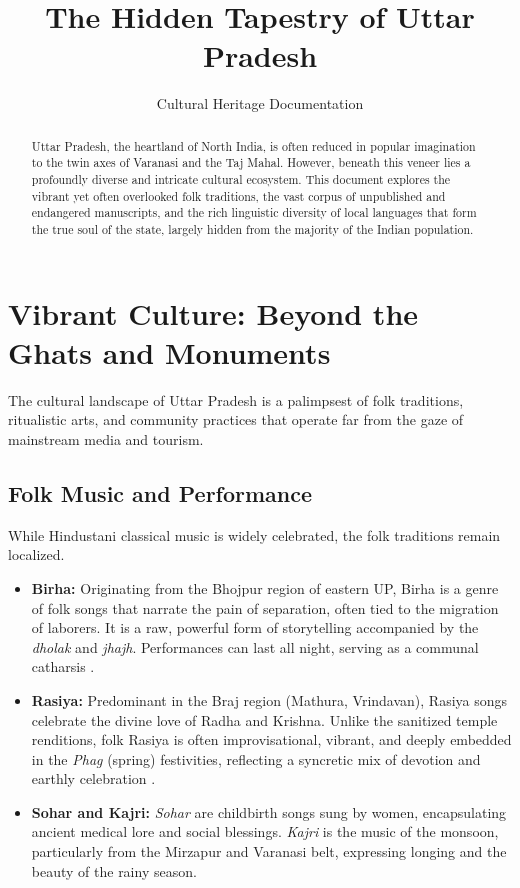 \documentclass{article}
\title{\textbf{The Hidden Tapestry of Uttar Pradesh}}
\author{Cultural Heritage Documentation}
\date{}
\begin{document}
\maketitle

\begin{abstract}
Uttar Pradesh, the heartland of North India, is often reduced in popular imagination to the twin axes of Varanasi and the Taj Mahal. However, beneath this veneer lies a profoundly diverse and intricate cultural ecosystem. This document explores the vibrant yet often overlooked folk traditions, the vast corpus of unpublished and endangered manuscripts, and the rich linguistic diversity of local languages that form the true soul of the state, largely hidden from the majority of the Indian population.
\end{abstract}

\section{Vibrant Culture: Beyond the Ghats and Monuments}
The cultural landscape of Uttar Pradesh is a palimpsest of folk traditions, ritualistic arts, and community practices that operate far from the gaze of mainstream media and tourism.

\subsection{Folk Music and Performance}
While Hindustani classical music is widely celebrated, the folk traditions remain localized.
\begin{itemize}
    \item \textbf{Birha:} Originating from the Bhojpur region of eastern UP, Birha is a genre of folk songs that narrate the pain of separation, often tied to the migration of laborers. It is a raw, powerful form of storytelling accompanied by the \textit{dholak} and \textit{jhajh}. Performances can last all night, serving as a communal catharsis \cite{kumar2020birha}.
    \item \textbf{Rasiya:} Predominant in the Braj region (Mathura, Vrindavan), Rasiya songs celebrate the divine love of Radha and Krishna. Unlike the sanitized temple renditions, folk Rasiya is often improvisational, vibrant, and deeply embedded in the \textit{Phag} (spring) festivities, reflecting a syncretic mix of devotion and earthly celebration \cite{henry1988ritual}.
    \item \textbf{Sohar and Kajri:} \textit{Sohar} are childbirth songs sung by women, encapsulating ancient medical lore and social blessings. \textit{Kajri} is the music of the monsoon, particularly from the Mirzapur and Varanasi belt, expressing longing and the beauty of the rainy season.
\end{itemize}
\end{document}
